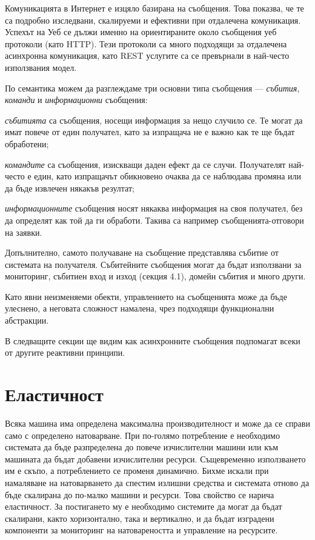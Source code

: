 Комуникацията в Интернет е изцяло базирана на съобщения. Това показва, че те са подробно изследвани, скалируеми и ефективни при отдалечена комуникация. Успехът на Уеб се дължи именно на ориентираните около съобщения уеб протоколи (като HTTP). Тези протоколи са много подходящи за отдалечена асинхронна комуникация, като REST услугите са се превърнали в най-често използвания модел.

По семантика можем да разглеждаме три основни типа съобщения — \emph{събития},  \emph{команди} и \emph{информационни} съобщения:

\begin{itemize*}
  \item \emph{събитията} са съобщения, носещи информация за нещо случило се. Те могат да имат повече от един получател, като за изпращача не е важно как те ще бъдат обработени;
  \item \emph{командите} са съобщения, изискващи даден ефект да се случи. Получателят най-често е един, като изпращачът обикновено очаква да се наблюдава промяна или да бъде извлечен някакъв резултат;
  \item \emph{информационните} съобщения носят някаква информация на своя получател, без да определят как той да ги обработи. Такива са например съобщенията-отговори на заявки.
\end{itemize*}

Допълнително, самото получаване на съобщение представлява събитие от системата на получателя. Събитейните съобщения могат да бъдат използвани за мониторинг, събитиен вход и изход (секция 4.1), домейн събития и много други.

Като явни неизменяеми обекти, управлението на съобщенията може да бъде улеснено, а неговата сложност намалена, чрез подходящи функционални абстракции.

В следващите секции ще видим как асинхронните съобщения подпомагат всеки от другите реактивни принципи.

\section{Еластичност}

Всяка машина има определена максимална производителност и може да се справи само с определено натоварване. При по-голямо потребление е необходимо системата да бъде разпределена до повече изчислителни машини или към машината да бъдат добавени изчислителни ресурси. Същевременно използването им е скъпо, а потреблението се променя динамично. Бихме искали при намаляване на натоварването да спестим излишни средства и системата отново да бъде скалирана до по-малко машини и ресурси. Това свойство се нарича еластичност. За постигането му е необходимо системите да могат да бъдат скалирани, както хоризонтално, така и вертикално, и да бъдат изградени компоненти за мониторинг на натовареността и управление на ресурсите.

